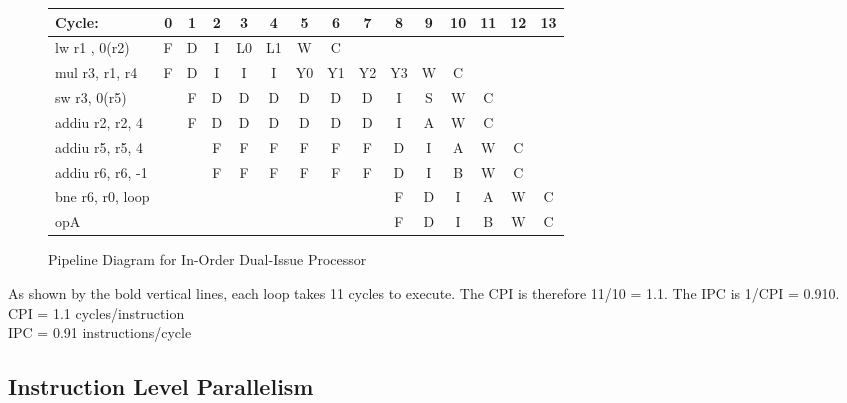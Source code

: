 \documentclass[10pt]{article}
\begin{document}
\begin{figure}[H]
\centering
{\setlength{\tabcolsep}{2pt}
\begin{tabular}{|l|c|c|c|c!{\vrule width 1.5pt}c|c|c|c|c|c|c|c|c|c!{\vrule width 1.5pt}}
\hline
Cycle:            & 0  & 1  & 2  & 3  & 4  & 5  & 6  & 7  & 8  & 9  & 10 & 11 & 12 & 13 \\ \hline
lw r1 , 0(r2)     & F  & D  & I  & L0 & L1 & W  & C  &    &    &    &    &    &    &    \\ \hline
mul r3, r1, r4    & F  & D  & I  & I  & I  & Y0 & Y1 & Y2 & Y3 & W  & C  &    &    &    \\ \hline
sw r3, 0(r5)      &    & F  & D  & D  & D  & D  & D  & D  & I  & S  & W  & C  &    &    \\ \hline
addiu r2, r2, 4   &    & F  & D  & D  & D  & D  & D  & D  & I  & A  & W  & C  &    &    \\ \hline
addiu r5, r5, 4   &    &    & F  & F  & F  & F  & F  & F  & D  & I  & A  & W  & C  &    \\ \hline
addiu r6, r6, -1  &    &    & F  & F  & F  & F  & F  & F  & D  & I  & B  & W  & C  &    \\ \hline
bne r6, r0, loop  &    &    &    &    &    &    &    &    & F  & D  & I  & A  & W  & C  \\ \hline
opA               &    &    &    &    &    &    &    &    & F  & D  & I  & B  & W  & C  \\ \hline
\end{tabular}
}
\caption{Pipeline Diagram for In-Order Dual-Issue Processor}
\end{figure}
As shown by the bold vertical lines, each loop takes 11 cycles to execute. The CPI is therefore 11/10 = 1.1. The IPC is 1/CPI = 0.910.\\
CPI = 1.1 cycles/instruction\\
IPC = 0.91 instructions/cycle\\

\subsection{Instruction Level Parallelism}
\end{document}
